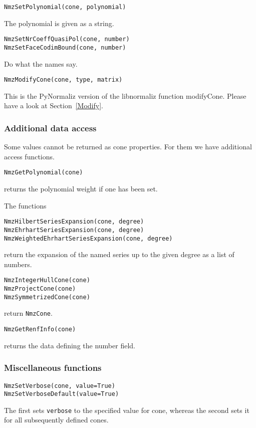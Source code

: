 \documentclass[12pt,a4paper]{scrartcl}
\theoremstyle{definition}
\begin{document}
\begin{small}
\begin{Verbatim}
NmzSetPolynomial(cone, polynomial)
\end{Verbatim}
The polynomial is given as a string.

\begin{Verbatim}
NmzSetNrCoeffQuasiPol(cone, number)
NmzSetFaceCodimBound(cone, number)
\end{Verbatim}
Do what the names say.

\begin{Verbatim}
NmzModifyCone(cone, type, matrix)
\end{Verbatim}
This is the PyNormaliz version of the libnormaliz function modifyCone. Please have a look at Section~\ref{Modify}.

\subsubsection{Additional data access}

Some values cannot be returned as cone properties. For them we have additional access functions.

\begin{Verbatim}
NmzGetPolynomial(cone)
\end{Verbatim}
returns the polynomial weight if one has been set.

The functions
\begin{Verbatim}
NmzHilbertSeriesExpansion(cone, degree)
NmzEhrhartSeriesExpansion(cone, degree)
NmzWeightedEhrhartSeriesExpansion(cone, degree)
\end{Verbatim}
return the expansion of the named series up to the given degree as a list of numbers.

\begin{Verbatim}
NmzIntegerHullCone(cone)
NmzProjectCone(cone)
NmzSymmetrizedCone(cone)
\end{Verbatim}
return \verb|NmzCone|.

\begin{Verbatim}
NmzGetRenfInfo(cone)
\end{Verbatim}
returns the data defining the number field.

\subsubsection{Miscellaneous functions}

\begin{Verbatim}
NmzSetVerbose(cone, value=True)
NmzSetVerboseDefault(value=True)
\end{Verbatim}
The first sets \verb|verbose| to the specified value for cone, whereas the second sets it for all subsequently defined cones.


\end{small}
\end{document}
